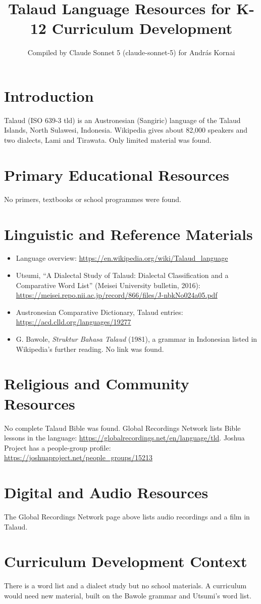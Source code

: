 \documentclass[12pt]{article}
\title{Talaud Language Resources for K-12 Curriculum Development}
\author{Compiled by Claude Sonnet 5 (claude-sonnet-5) for Andr\'as Kornai}
\date{}
\begin{document}
\maketitle

\section{Introduction}
Talaud (ISO 639-3 tld) is an Austronesian (Sangiric) language of the Talaud Islands, North Sulawesi, Indonesia. Wikipedia gives about 82,000 speakers and two dialects, Lami and Tirawata. Only limited material was found.

\section{Primary Educational Resources}
No primers, textbooks or school programmes were found.

\section{Linguistic and Reference Materials}
\begin{itemize}
\item Language overview: \url{https://en.wikipedia.org/wiki/Talaud_language}
\item Utsumi, ``A Dialectal Study of Talaud: Dialectal Classification and a Comparative Word List'' (Meisei University bulletin, 2016): \url{https://meisei.repo.nii.ac.jp/record/866/files/J-nbkNo024a05.pdf}
\item Austronesian Comparative Dictionary, Talaud entries: \url{https://acd.clld.org/languages/19277}
\item G. Bawole, \emph{Struktur Bahasa Talaud} (1981), a grammar in Indonesian listed in Wikipedia's further reading. No link was found.
\end{itemize}

\section{Religious and Community Resources}
No complete Talaud Bible was found. Global Recordings Network lists Bible lessons in the language: \url{https://globalrecordings.net/en/language/tld}. Joshua Project has a people-group profile: \url{https://joshuaproject.net/people_groups/15213}

\section{Digital and Audio Resources}
The Global Recordings Network page above lists audio recordings and a film in Talaud.

\section{Curriculum Development Context}
There is a word list and a dialect study but no school materials. A curriculum would need new material, built on the Bawole grammar and Utsumi's word list.
\end{document}
